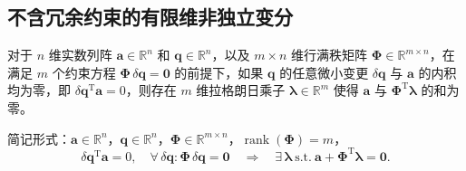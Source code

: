 \subsection{不含冗余约束的有限维非独立变分}
\begin{theorem}[不含冗余约束的有限维非独立变分原理]
对于 $n$ 维实数列阵 $\boldsymbol{a}\in\mathbb{R}^n$ 和 $\boldsymbol{q}\in\mathbb{R}^n$，以及 $m\times n$ 维行满秩矩阵 $\boldsymbol{\Phi}\in\mathbb{R}^{m\times n}$，在满足 $m$ 个约束方程 $\boldsymbol{\Phi}\,\delta\boldsymbol{q}=\boldsymbol{0}$ 的前提下，如果 $\boldsymbol{q}$ 的任意微小变更 $\delta\boldsymbol{q}$ 与 $\boldsymbol{a}$ 的内积均为零，即 $\delta\boldsymbol{q}^{\mathrm{T}}\boldsymbol{a}=0$，则存在 $m$ 维拉格朗日乘子 $\boldsymbol{\lambda}\in\mathbb{R}^m$ 使得 $\boldsymbol{a}$ 与 $\boldsymbol{\Phi}^{\mathrm{T}}\boldsymbol{\lambda}$ 的和为零。
\end{theorem}
简记形式：$\boldsymbol{a}\in\mathbb{R}^n$，$\boldsymbol{q}\in\mathbb{R}^n$，$\boldsymbol{\Phi}\in\mathbb{R}^{m\times n}$，$\operatorname{rank}(\boldsymbol{\Phi})=m$，
\[
\delta\boldsymbol{q}^{\mathrm{T}}\boldsymbol{a}=0,\quad\forall\,\delta\boldsymbol{q}:\boldsymbol{\Phi}\,\delta\boldsymbol{q}=\boldsymbol{0}\quad\Rightarrow\quad\exists\,\boldsymbol{\lambda}\ \mathrm{s.t.}\ \boldsymbol{a}+\boldsymbol{\Phi}^{\mathrm{T}}\boldsymbol{\lambda}=\boldsymbol{0}.
\]
